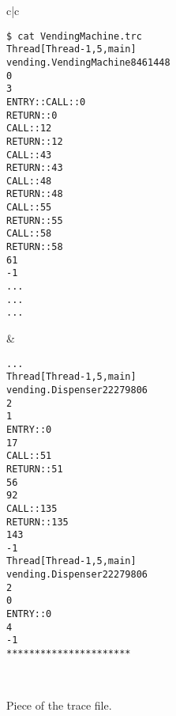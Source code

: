 \begin{figure}[!ht]
\begin{center}\cmdsize
\begin{tabular}{c|c}
\begin{minipage}{2.5in}
\begin{verbatim}
$ cat VendingMachine.trc
Thread[Thread-1,5,main]
vending.VendingMachine8461448
0
3
ENTRY::CALL::0
RETURN::0
CALL::12
RETURN::12
CALL::43
RETURN::43
CALL::48
RETURN::48
CALL::55
RETURN::55
CALL::58
RETURN::58
61
-1
...
...
...
\end{verbatim}
\end{minipage}
&
\begin{minipage}{2.5in}
\begin{verbatim}
...
Thread[Thread-1,5,main]
vending.Dispenser22279806
2
1
ENTRY::0
17
CALL::51
RETURN::51
56
92
CALL::135
RETURN::135
143
-1
Thread[Thread-1,5,main]
vending.Dispenser22279806
2
0
ENTRY::0
4
-1
**********************
\end{verbatim}
\end{minipage}\\
\end{tabular}
\end{center}
\caption{Piece of the trace file.}\label{fig:trace-file}
\end{figure}
